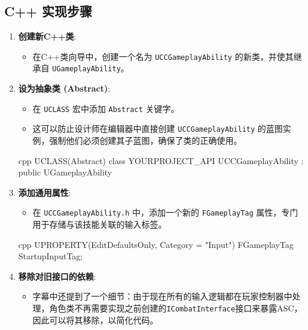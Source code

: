 \documentclass[10pt,CJKmath]{zhbook-v1}
\begin{document}
\subsection{C++ 实现步骤}
\begin{enumerate}
    \item \textbf{创建新C++类}:
    \begin{itemize}
        \item 在C++类向导中，创建一个名为 \texttt{UCCGameplayAbility} 的新类，并使其继承自 \texttt{UGameplayAbility}。
    \end{itemize}
    \item \textbf{设为抽象类 (Abstract)}:
    \begin{itemize}
        \item 在 \texttt{UCLASS} 宏中添加 \texttt{Abstract} 关键字。
        \item 这可以防止设计师在编辑器中直接创建 \texttt{UCCGameplayAbility} 的蓝图实例，强制他们必须创建其子蓝图，确保了类的正确使用。
    \end{itemize}
    \begin{amzcode}{cpp}
    UCLASS(Abstract)
    class YOURPROJECT_API UCCGameplayAbility : public UGameplayAbility
    \end{amzcode}
    \item \textbf{添加通用属性}:
    \begin{itemize}
        \item 在 \texttt{UCCGameplayAbility.h} 中，添加一个新的 \texttt{FGameplayTag} 属性，专门用于存储与该技能关联的输入标签。
    \end{itemize}
    \begin{amzcode}{cpp}
    UPROPERTY(EditDefaultsOnly, Category = "Input")
    FGameplayTag StartupInputTag;
    \end{amzcode}
    \item \textbf{移除对旧接口的依赖}:
    \begin{itemize}
        \item 字幕中还提到了一个细节：由于现在所有的输入逻辑都在玩家控制器中处理，角色类不再需要实现之前创建的\texttt{ICombatInterface}接口来暴露ASC，因此可以将其移除，以简化代码。
    \end{itemize}
\end{enumerate}
\end{document}
